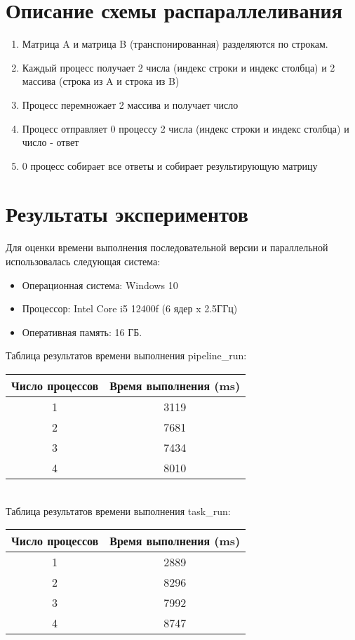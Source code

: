 \documentclass[a4paper,12pt]{article}
\begin{document}
\section{Описание схемы распараллеливания}

\begin{enumerate}
  \item Матрица A и матрица B (транспонированная) разделяются по строкам.
  \item Каждый процесс получает 2 числа (индекс строки и индекс столбца) и 2 массива (строка из A и строка из B)
  \item Процесс перемножает 2 массива и получает число
  \item Процесс отправляет 0 процессу 2 числа (индекс строки и индекс столбца) и число - ответ
  \item 0 процесс собирает все ответы и собирает результирующую матрицу
\end{enumerate}



\section{Результаты экспериментов}
Для оценки времени выполнения последовательной версии и параллельной использовалась следующая система:
\begin{itemize}
    \item Операционная система: Windows 10
    \item Процессор: Intel Core i5 12400f (6 ядер x 2.5ГГц)
    \item Оперативная память: 16 ГБ.
\end{itemize}
Таблица результатов времени выполнения pipeline\_run:\\[0,5cm]
\begin{tabular}{|c|c|}
    \hline
    Число процессов   & Время выполнения (ms)  \\ \hline
    1               & 3119                   \\ \hline
    2                &7681                   \\ \hline
    3                   & 7434                     \\ \hline
    4                   &8010                     \\ \hline
\end{tabular}\\[1cm]

Таблица результатов времени выполнения task\_run:\\[0,5cm]
\begin{tabular}{|c|c|}
    \hline
    Число процессов   & Время выполнения (ms)  \\ \hline
    1               & 2889                    \\ \hline
    2                & 8296                \\ \hline
    3                & 7992                     \\ \hline
    4                   & 8747                      \\ \hline
\end{tabular}
\end{document}
